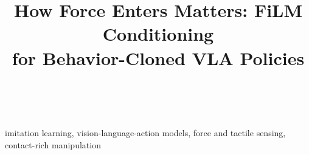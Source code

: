 \documentclass[conference]{IEEEtran}
\begin{document}

\title{How Force Enters Matters: FiLM Conditioning\\for Behavior-Cloned VLA Policies}

\author{\\
}

\maketitle

\begin{abstract}

\end{abstract}

\begin{IEEEkeywords}
imitation learning, vision-language-action models, force and tactile sensing, contact-rich manipulation
\end{IEEEkeywords}












\end{document}
